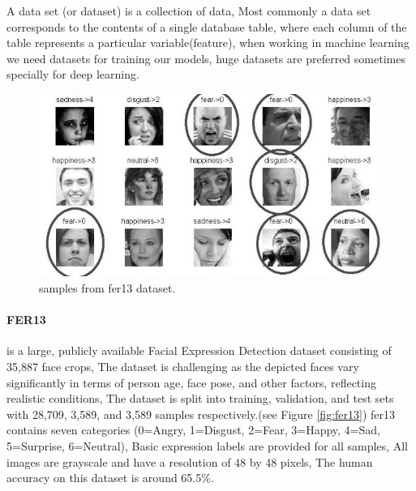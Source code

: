 A data set (or dataset) is a collection of data, Most commonly a data set corresponds to the contents of a single database table, where each column of the table represents a particular variable(feature), when working in machine learning we need datasets for training our models, huge datasets are preferred sometimes specially for deep learning.

\begin{figure}
	\centering
	\includegraphics[width=.7\textwidth]{images/fer2013.jpg}
	\caption{samples from fer13 dataset.}
\end{figure}
\paragraph{FER13} is a large, publicly available Facial Expression Detection dataset consisting of 35,887 face crops, The dataset is challenging as the depicted faces vary significantly in terms of person age, face pose, and other factors, reflecting realistic conditions, 
The dataset is split into training, validation, and test sets with 28,709, 3,589, and 3,589 samples respectively.(see Figure \ref{fig:fer13})\newline
fer13 contains seven categories (0=Angry, 1=Disgust, 2=Fear, 3=Happy, 4=Sad, 5=Surprise, 6=Neutral), Basic expression labels are provided for all samples, All images are grayscale and have a resolution of 48 by 48 pixels, The human accuracy on this dataset is around 65.5\%. \newline
 
